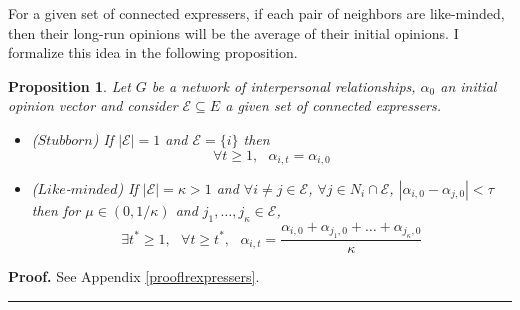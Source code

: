 \documentclass{article}
\newtheorem{proposition}{Proposition}
\newenvironment{proof}[1][Proof]{\textbf{#1.} }{\ \rule{0.5em}{0.5em}}
\begin{document}
For a given set of connected expressers, if each pair of neighbors are like-minded, then their long-run opinions will be the average of their initial opinions. I formalize this idea in the following proposition. 
\begin{proposition}  Let $G$ be a network of interpersonal relationships, $\alpha_{0}$ an initial opinion vector and consider $\mathcal{E} \subseteq E$ a given set of connected expressers. 

\begin{itemize}
\item[$(i)$] ($Stubborn$) If $|\mathcal{E}|=1$ and $\mathcal{E} = \{ i \}$ then $$\forall t \geq 1, \mbox{ } \alpha_{i,t} = \alpha_{i,0}$$

\item[$(ii)$] ($Like$-$minded$) If $|\mathcal{E}| = \kappa > 1$ and $ \forall i \neq j \in \mathcal{E}$, $\forall j \in N_i \cap \mathcal{E} $, $|\alpha_{i,0} - \alpha_{j,0} | < \tau $  then for $\mu \in (0, 1/\kappa)$ and $j_1 , \ldots , j_{\kappa} \in \mathcal{E}$,
$$\exists t^{*} \geq 1,  \mbox{ } \forall t \geq t^{*}, \mbox{ } \alpha_{i,t} = \frac{\alpha_{i,0} + \alpha_{j_1,0} + \ldots + \alpha_{j_{\kappa},0}}{\kappa } $$

\end{itemize}
\label{expressers}
\end{proposition}

\noindent \begin{proof} See Appendix \ref{prooflrexpressers}.\end{proof}
\end{document}
